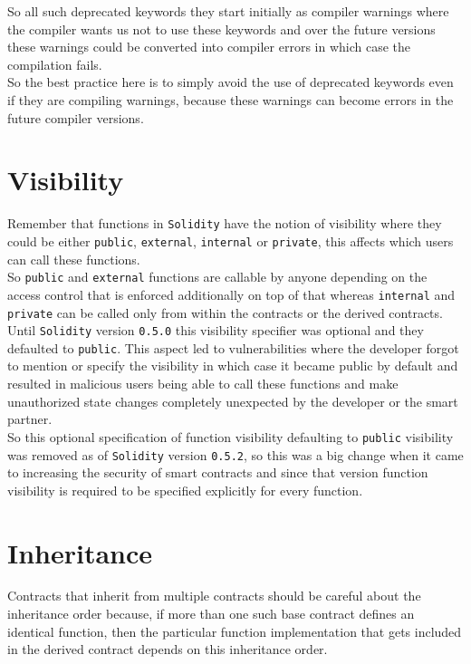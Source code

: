 So all such deprecated keywords they start initially as compiler warnings where the compiler wants us not to use these keywords and over the future versions these warnings could be converted into compiler errors in which case the compilation fails. \\

So the best practice here is to simply avoid the use of deprecated keywords even if they are compiling warnings, because these warnings can become errors in the future compiler versions.

\section{Visibility}

Remember that functions in \texttt{Solidity} have the notion of visibility where they could be either \texttt{public}, \texttt{external}, \texttt{internal} or \texttt{private}, this affects which users can call these functions.\\

So \texttt{public} and \texttt{external} functions are callable by anyone depending on the access control that is enforced additionally on top of that whereas \texttt{internal} and \texttt{private} can be called only from within the contracts or the derived contracts.\\

Until \texttt{Solidity} version \texttt{0.5.0} this visibility specifier was optional and they defaulted to \texttt{public}. This aspect led to vulnerabilities where the developer forgot to mention or specify the visibility in which case it became public by default and resulted in malicious users being able to call these functions and make unauthorized state changes completely unexpected by the developer or the smart partner.\\

So this optional specification of function visibility defaulting to \texttt{public} visibility was removed as of \texttt{Solidity} version \texttt{0.5.2}, so this was a big change when it came to increasing the security of smart contracts and since that version function visibility is required to be specified explicitly for every function.

\section{Inheritance}

Contracts that inherit from multiple contracts should be careful about the inheritance order because, if more than one such base contract defines an identical function, then the particular function implementation that gets included in the derived contract depends on this inheritance order.\\

